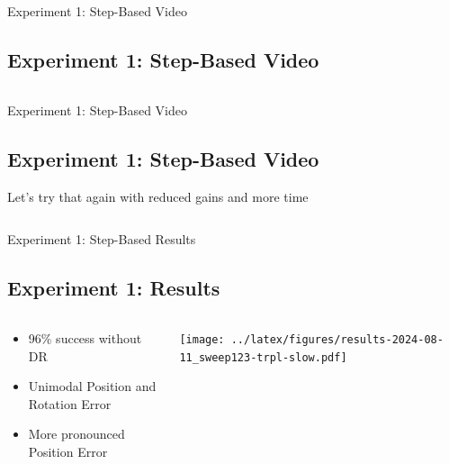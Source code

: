 \documentclass[16:9,en,navbarinfooter]{sdqbeamer}
\begin{document}
\begin{frame}{Experiment 1: Step-Based Video}
	\subsection{Experiment 1: Step-Based Video}

	\begin{columns}[t]
		\vspace{1cm}

	\end{columns}
\end{frame}
\begin{frame}{Experiment 1: Step-Based Video}
	\subsection{Experiment 1: Step-Based Video}


	\vspace{1cm}
	Let's try that again with reduced gains and more time
	\begin{columns}[t]
		\vspace{1cm}
	\end{columns}

\end{frame}
\begin{frame}{Experiment 1: Step-Based Results}
	\subsection{Experiment 1: Results}

	\begin{columns}[t]
		\begin{column}{0.3\textwidth}
			\vspace{1cm}
			\begin{itemize}
				\item 96\% success without DR
				\item Unimodal Position and Rotation Error
				\item More pronounced Position Error
			\end{itemize}
		\end{column}
		\begin{column}{0.7\textwidth}
			\vspace{1cm}
			\texttt{[image: ../latex/figures/results-2024-08-11\_sweep123-trpl-slow.pdf]}
		\end{column}
	\end{columns}
\end{frame}
\end{document}
